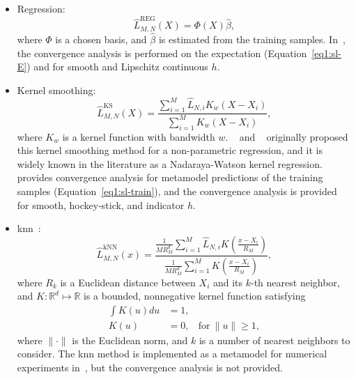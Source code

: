\begin{itemize}
    \item   Regression:
            \begin{equation*}
            \hat{L}^{\text{REG}}_{M, N}(X) = \Phi(X) \hat{\beta},
            \end{equation*}
            where $\Phi$ is a chosen basis, and $\hat{\beta}$ is estimated from the training samples.
            In~\cite{broadie2015risk}, the convergence analysis is performed on the expectation (Equation~\eqref{eq1:sl-E}) and for smooth and Lipschitz continuous $h$. 
    \item   Kernel smoothing:
            $$\hat{L}^{\text{KS}}_{M, N}(X) = \frac{\sum_{i=1}^M \hat{L}_{N, i} K_w(X - X_i)}{\sum_{i=1}^M K_w(X - X_i)}, $$
            where $K_w$ is a kernel function with bandwidth $w$.
            ~\cite{nadaraya1964estimating} and ~\cite{watson1964smooth} originally proposed this kernel smoothing method for a non-parametric regression, and it is widely known in the literature as a Nadaraya-Watson kernel regression.
            ~\cite{hong2017kernel} provides convergence analysis for metamodel predictions of the training samples (Equation~\eqref{eq1:sl-train}), and the convergence analysis is provided for smooth, hockey-stick, and indicator $h$. 

    \item   \gls{knn}~\citep{mack1981local}:
            \begin{equation*}
            \hat{L}^{\text{kNN}}_{M, N}(x) 
            = \frac{\frac{1}{M R_M^d} \sum_{i=1}^M \hat{L}_{N, i} K\left(\frac{x - X_i}{R_M}\right)}{\frac{1}{M R_M^d} \sum_{i=1}^M K\left(\frac{x - X_i}{R_M}\right)},
            \end{equation*}
            where $R_k$ is a Euclidean distance between $X_i$ and its $k$-th nearest neighbor, and $K:\mathbb{R}^d \mapsto \mathbb{R}$ is a bounded, nonnegative kernel function satisfying 
            \begin{align*}
                \int K(u) du & = 1, \\
                K(u) &= 0, ~~~ ~\text{for}~ \|u\| \geq 1,
            \end{align*}
            where $\|\cdot\|$ is the Euclidean norm, and  $k$ is a number of nearest neighbors to consider.
            The \gls{knn} method is implemented as a metamodel for numerical experiments in~\cite{hong2017kernel}, but the convergence analysis is not provided.


\end{itemize}
